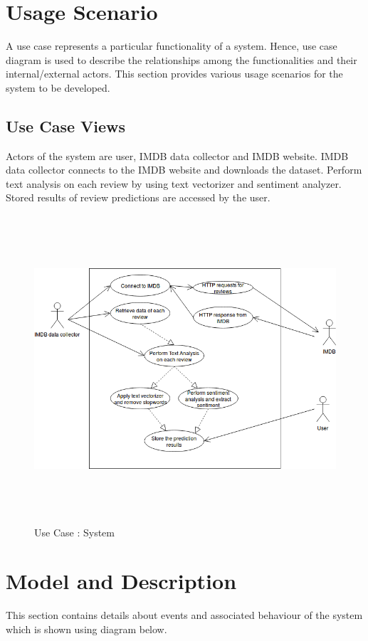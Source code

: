 \documentclass[oneside,a4paper,12pt]{pictreport}
\begin{document}
\section{Usage Scenario}
A use case represents a particular functionality of a system.
Hence, use case diagram is used to describe the relationships among the 
functionalities and their internal/external actors. This section provides
various usage scenarios for the system to be developed.


\newpage
\subsection{Use Case Views}
Actors of the system are user, IMDB data collector and IMDB website.
IMDB data collector connects to the IMDB website and downloads the dataset.
Perform text analysis on each review by using text vectorizer and sentiment 
analyzer. Stored results of review predictions are accessed by the user.



\vspace{5mm}

\begin{figure}[h!]
\includegraphics[width=5.2in,height=4.5in]{usecase2.png}
\caption{Use Case : System}
\end{figure}
\newpage
\section{Model and Description}
This section contains details about events and associated behaviour of the system which is shown using diagram below.
\end{document}
